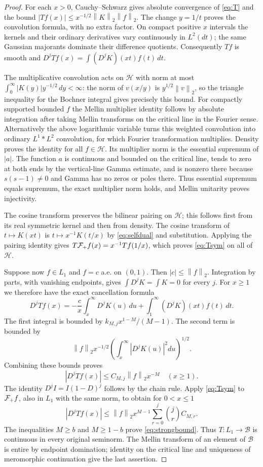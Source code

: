 \documentclass[11pt]{article}
\newcommand{\B}{\mathscr B}\newcommand{\HH}{\mathcal H}
\newcommand{\norm}[1]{\left\lVert#1\right\rVert}
\begin{document}
\begin{proof}
For each $x>0$, Cauchy--Schwarz gives absolute convergence of
\eqref{eq:T} and the bound
$|Tf(x)|\leq x^{-1/2}\norm K_2\norm f_2$.
The change $y=1/t$ proves the convolution formula, with no extra
factor. On compact positive $x$ intervals the kernels and their
ordinary derivatives vary continuously in $L^2(dt)$; the same
Gaussian majorants dominate their difference quotients. Consequently
$Tf$ is smooth and $D^jTf(x)=\int(D^jK)(xt)f(t)\,dt$.

The multiplicative convolution acts on $\HH$ with norm at most
$\int_0^\infty|K(y)|y^{-1/2}\,dy<\infty$:
the norm of $v(x/y)$ is $y^{1/2}\norm v_2$, so the triangle
inequality for the Bochner integral gives precisely this bound.
For compactly supported bounded $f$ the Mellin multiplier identity
follows by absolute integration after taking Mellin transforms on
the critical line in the Fourier sense. Alternatively the above
logarithmic variable turns this weighted convolution into ordinary
$L^1*L^2$ convolution, for which Fourier transformation multiplies.
Density proves the identity for all $f\in\HH$. Its multiplier
norm is the essential supremum of $|a|$. The function $a$ is
continuous and bounded on the critical line, tends to zero at both
ends by the vertical-line Gamma estimate, and is nonzero there
because $s(s-1)\ne0$ and Gamma has no zeros or poles there.
Thus essential supremum equals supremum, the exact multiplier
norm holds, and Mellin unitarity proves injectivity.

The cosine transform preserves the bilinear pairing on $\HH$;
this follows first from its real symmetric kernel and then from
density. The cosine transform of $t\mapsto K(xt)$ is
$t\mapsto x^{-1}K(t/x)$ by \eqref{eq:selfdual} and substitution.
Applying the pairing identity gives $T\mathcal F_+ f(x)=x^{-1}Tf(1/x)$,
which proves \eqref{eq:Tsym} on all of $\HH$.

Suppose now $f\in L_1$ and $f=c$ a.e. on $(0,1)$. Then
$|c|\leq\norm f_2$. Integration by parts, with vanishing
endpoints, gives $\int D^jK=\int K=0$ for every $j$. For $x\geq1$
we therefore have the exact cancellation formula
\[
 D^jTf(x)=-\frac c x\int_x^\infty D^jK(u)\,du
                      +\int_1^\infty(D^jK)(xt)f(t)\,dt.
\]
The first integral is bounded by $k_{M,j}x^{1-M}/(M-1)$.
The second term is bounded by
\[
 \norm f_2x^{-1/2}\left(\int_x^\infty|D^jK(u)|^2du\right)^{1/2}.
\]
Combining these bounds proves
\begin{equation}\label{eq:tail}
 |D^jTf(x)|\leq C_{M,j}\norm f_2 x^{-M}\quad(x\geq1).
\end{equation}
The identity $D^jI=I(1-D)^j$ follows by the chain rule. Apply
\eqref{eq:Tsym} to $\mathcal F_+ f$, also in $L_1$ with the same norm,
to obtain for $0<x\leq1$
\[
 |D^jTf(x)|\leq\norm f_2 x^{M-1}
                           \sum_{r=0}^j\binom jr C_{M,r}.
\]
The inequalities $M\geq b$ and $M\geq1-b$ prove
\eqref{eq:strongbound}. Thus $T:L_1\to\B$ is continuous in
every original seminorm. The Mellin transform of an element of
$\B$ is entire by endpoint domination; identity on the critical
line and uniqueness of meromorphic continuation give the last
assertion.
\end{proof}
\end{document}
